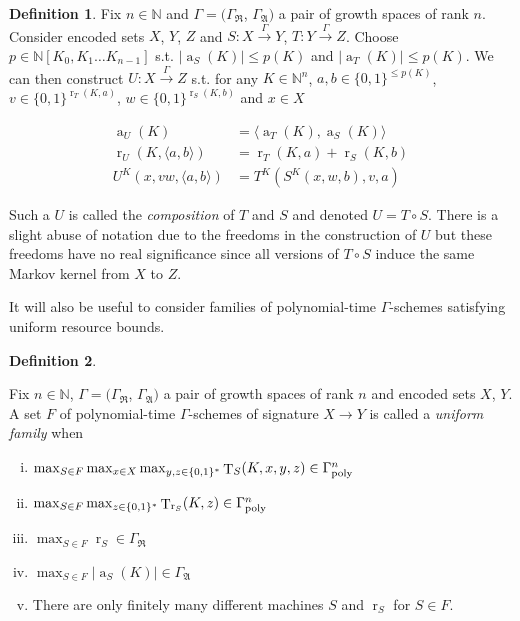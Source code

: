 \documentclass{article}
\numberwithin{equation}{section}
\theoremstyle{definition}
\newtheorem{definition}{Definition}[section]
\theoremstyle{plain}
\newcommand{\Bool}{\{0,1\}}
\newcommand{\Words}{{\Bool^*}}
\DeclareMathOperator{\T}{T}
\DeclareMathOperator{\R}{r}
\DeclareMathOperator{\A}{a}
\newcommand{\Nats}{\mathbb{N}}
\newcommand{\NatPoly}{\Nats[K_0, K_1 \ldots K_{n-1}]}
\newcommand{\Abs}[1]{\lvert #1 \rvert}
\newcommand{\Chev}[1]{\langle #1 \rangle}
\newcommand{\GrowR}{\Gamma_{\mathfrak{R}}}
\newcommand{\GrowA}{\Gamma_{\mathfrak{A}}}
\newcommand{\GammaPoly}{\Gamma_{\textnormal{poly}}}
\newcommand{\Scheme}{\xrightarrow{\Gamma}}
\begin{document}
\begin{samepage}
\begin{definition}

Fix $n \in \Nats$ and $\Gamma=(\GrowR$, $\GrowA)$ a pair of growth spaces of rank $n$. Consider encoded sets $X$, $Y$, $Z$ and $S: X \Scheme Y$, $T: Y \Scheme Z$. Choose $p \in \NatPoly$ s.t. $\Abs{\A_S(K)} \leq p(K)$ and $\Abs{\A_T(K)} \leq p(K)$. We can then construct $U: X \Scheme Z$ s.t. for any $K \in \Nats^n$, $a,b \in \Bool^{\leq p(K)}$, ${v \in \Bool^{\R_T(K,a)}}$, ${w \in \Bool^{\R_S(K,b)}}$ and $x \in X$

\begin{align}
\A_U(K) &= \Chev{\A_T(K),\A_S(K)} \\
\R_U(K, \Chev{a,b}) &= \R_T(K,a)+\R_S(K,b) \\
U^K(x,vw,\Chev{a,b}) &= T^K(S^K(x,w,b),v,a)
\end{align}

Such a $U$ is called the \emph{composition} of $T$ and $S$ and denoted $U = T \circ S$. There is a slight abuse of notation due to the freedoms in the construction of $U$ but these freedoms have no real significance since all versions of $T \circ S$ induce the same Markov kernel from $X$ to $Z$.

\end{definition}
\end{samepage}

It will also be useful to consider families of polynomial-time $\Gamma$-schemes satisfying uniform resource bounds.

\begin{definition}
\label{def:family}

Fix $n \in \Nats$, $\Gamma=(\GrowR$, $\GrowA)$ a pair of growth spaces of rank $n$ and encoded sets $X$, $Y$. A set $F$ of polynomial-time $\Gamma$-schemes of signature $X \rightarrow Y$ is called a \emph{uniform family} when

\begin{enumerate}[(i)]

\item\label{con:def__family__time} $\max_{S \in F} \max_{x \in X} \max_{y,z \in \Words} \T_S(K,x,y,z) \in \GammaPoly^n$

\item\label{con:def__family__rtime} $\max_{S \in F} \max_{z \in \Words} \T_{\R_S}(K,z) \in \GammaPoly^n$

\item\label{con:def__family__rand} $\max_{S \in F} \R_S \in \GrowR$

\item\label{con:def__family__adv} $\max_{S \in F} \Abs{\A_S(K)} \in \GrowA$

\item There are only finitely many different machines ${S}$ and ${\R_S}$ for ${S \in F}$.

\end{enumerate}

\end{definition}
\end{document}
